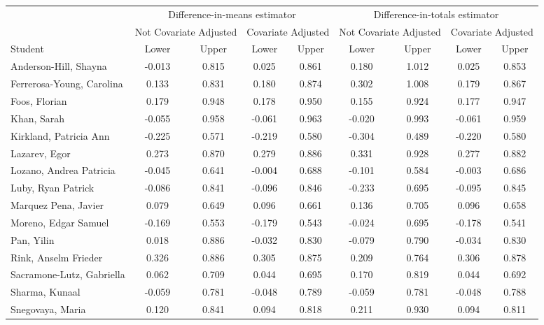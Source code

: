 \documentclass[11pt,notitlepage]{article}
\begin{document}
\begin{table}[h!]\small\doublespacing
\begin{center}
\begin{tabular}{lcc|cc|cc|cc}
  \hline
         & \multicolumn{4}{c|}{Difference-in-means estimator} & \multicolumn{4}{c}{Difference-in-totals estimator} \\
         \cline{2-9}
         & \multicolumn{2}{c}{Not Covariate Adjusted} & \multicolumn{2}{c|}{Covariate Adjusted} &  \multicolumn{2}{c}{Not Covariate Adjusted} & \multicolumn{2}{c}{Covariate Adjusted} \\
         \cline{2-9}
 Student & Lower & Upper & Lower & Upper & Lower & Upper & Lower & Upper \\
  \hline
Anderson-Hill, Shayna & -0.013 & 0.815 & 0.025 & 0.861 & 0.180 & 1.012 & 0.025 & 0.853 \\ 
  Ferrerosa-Young, Carolina & 0.133 & 0.831 & 0.180 & 0.874 & 0.302 & 1.008 & 0.179 & 0.867 \\ 
  Foos, Florian & 0.179 & 0.948 & 0.178 & 0.950 & 0.155 & 0.924 & 0.177 & 0.947 \\ 
  Khan, Sarah & -0.055 & 0.958 & -0.061 & 0.963 & -0.020 & 0.993 & -0.061 & 0.959 \\ 
  Kirkland, Patricia Ann & -0.225 & 0.571 & -0.219 & 0.580 & -0.304 & 0.489 & -0.220 & 0.580 \\ 
  Lazarev, Egor & 0.273 & 0.870 & 0.279 & 0.886 & 0.331 & 0.928 & 0.277 & 0.882 \\ 
  Lozano, Andrea Patricia & -0.045 & 0.641 & -0.004 & 0.688 & -0.101 & 0.584 & -0.003 & 0.686 \\ 
  Luby, Ryan Patrick & -0.086 & 0.841 & -0.096 & 0.846 & -0.233 & 0.695 & -0.095 & 0.845 \\ 
  Marquez Pena, Javier & 0.079 & 0.649 & 0.096 & 0.661 & 0.136 & 0.705 & 0.096 & 0.658 \\ 
  Moreno, Edgar Samuel & -0.169 & 0.553 & -0.179 & 0.543 & -0.024 & 0.695 & -0.178 & 0.541 \\ 
  Pan, Yilin & 0.018 & 0.886 & -0.032 & 0.830 & -0.079 & 0.790 & -0.034 & 0.830 \\ 
  Rink, Anselm Frieder & 0.326 & 0.886 & 0.305 & 0.875 & 0.209 & 0.764 & 0.306 & 0.878 \\ 
  Sacramone-Lutz, Gabriella & 0.062 & 0.709 & 0.044 & 0.695 & 0.170 & 0.819 & 0.044 & 0.692 \\ 
  Sharma, Kunaal & -0.059 & 0.781 & -0.048 & 0.789 & -0.059 & 0.781 & -0.048 & 0.788 \\ 
  Snegovaya, Maria & 0.120 & 0.841 & 0.094 & 0.818 & 0.211 & 0.930 & 0.094 & 0.811 \\ 

\end{tabular}
\end{center}
\end{table}
\end{document}

